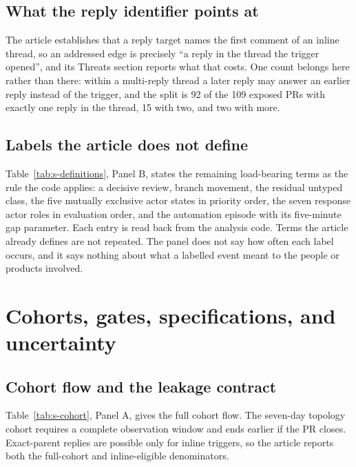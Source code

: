 \documentclass[pdflatex,sn-basic]{sn-jnl}
\begin{document}
\subsection{What the reply identifier points at}\label{app:reply-target}

The article establishes that a reply target names the first comment of an inline
thread, so an addressed edge is precisely ``a reply in the thread the trigger
opened'', and its Threats section reports what that costs. One count belongs
here rather than there: within a multi-reply thread a later reply may answer an
earlier reply instead of the trigger, and the split is 92 of the 109 exposed PRs
with exactly one reply in the thread, 15 with two, and two with more.

\subsection{Labels the article does not define}\label{app:glossary}

Table~\ref{tab:s-definitions}, Panel B, states the remaining load-bearing terms
as the rule the code applies: a decisive review, branch movement, the residual
untyped class, the five mutually exclusive actor states in priority order, the
seven response actor roles in evaluation order, and the automation episode with
its five-minute gap parameter. Each entry is read back from the analysis code.
Terms the article already defines are not repeated. The panel does not say how
often each label occurs, and it says nothing about what a labelled event meant
to the people or products involved.



\section{Cohorts, gates, specifications, and uncertainty}\label{app:cohorts}

\subsection{Cohort flow and the leakage contract}\label{app:funnel}

Table~\ref{tab:s-cohort}, Panel A, gives the full cohort flow. The seven-day
topology cohort requires a complete observation window and ends earlier if the
PR closes. Exact-parent replies are possible only for inline triggers, so the
article reports both the full-cohort and inline-eligible denominators.
\end{document}
